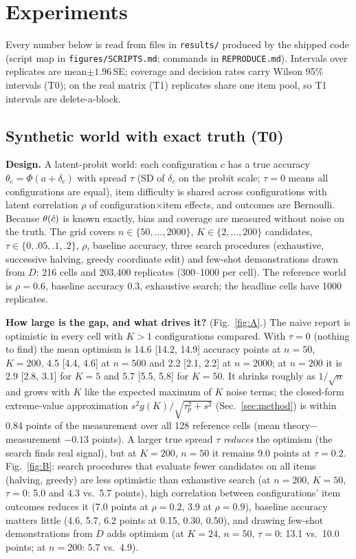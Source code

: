 \section{Experiments}
\label{sec:experiments}
Every number below is read from files in \texttt{results/} produced by the shipped code (script map in \texttt{figures/SCRIPTS.md}; commands in \texttt{REPRODUCE.md}). Intervals over replicates are mean$\pm1.96\,$SE; coverage and decision rates carry Wilson 95\% intervals (T0); on the real matrix (T1) replicates share one item pool, so T1 intervals are delete-a-block.

\subsection{Synthetic world with exact truth (T0)}
\textbf{Design.} A latent-probit world: each configuration $c$ has a true accuracy $\theta_c=\Phi(a+\delta_c)$ with spread $\tau$ (SD of $\delta_c$ on the probit scale; $\tau=0$ means all configurations are equal), item difficulty is shared across configurations with latent correlation $\rho$ of configuration$\times$item effects, and outcomes are Bernoulli. Because $\theta(\hat c)$ is known exactly, bias and coverage are measured without noise on the truth. The grid covers $n\in\{50,\dots,2000\}$, $K\in\{2,\dots,200\}$ candidates, $\tau\in\{0,.05,.1,.2\}$, $\rho$, baseline accuracy, three search procedures (exhaustive, successive halving, greedy coordinate edit) and few-shot demonstrations drawn from $D$: 216 cells and 203{,}400 replicates (300--1000 per cell). The reference world is $\rho=0.6$, baseline accuracy 0.3, exhaustive search; the headline cells have 1000 replicates.

\textbf{How large is the gap, and what drives it?} (Fig.~\ref{fig:A}.) The naive report is optimistic in every cell with $K>1$ configurations compared. With $\tau=0$ (nothing to find) the mean optimism is 14.6 [14.2, 14.9] accuracy points at $n=50$, $K=200$, 4.5 [4.4, 4.6] at $n=500$ and 2.2 [2.1, 2.2] at $n=2000$; at $n=200$ it is 2.9 [2.8, 3.1] for $K=5$ and 5.7 [5.5, 5.8] for $K=50$. It shrinks roughly as $1/\sqrt n$ and grows with $K$ like the expected maximum of $K$ noise terms; the closed-form extreme-value approximation $s^2g(K)/\sqrt{\tau_p^2+s^2}$ (Sec.~\ref{sec:method}) is within 0.84 points of the measurement over all 128 reference cells (mean theory$-$measurement $-0.13$ points). A larger true spread $\tau$ \emph{reduces} the optimism (the search finds real signal), but at $K=200$, $n=50$ it remains 9.0 points at $\tau=0.2$. Fig.~\ref{fig:B}: search procedures that evaluate fewer candidates on all items (halving, greedy) are less optimistic than exhaustive search (at $n=200$, $K=50$, $\tau=0$: 5.0 and 4.3 vs.\ 5.7 points), high correlation between configurations' item outcomes reduces it (7.0 points at $\rho=0.2$, 3.9 at $\rho=0.9$), baseline accuracy matters little (4.6, 5.7, 6.2 points at 0.15, 0.30, 0.50), and drawing few-shot demonstrations from $D$ adds optimism (at $K=24$, $n=50$, $\tau=0$: 13.1 vs.\ 10.0 points; at $n=200$: 5.7 vs.\ 4.9).

